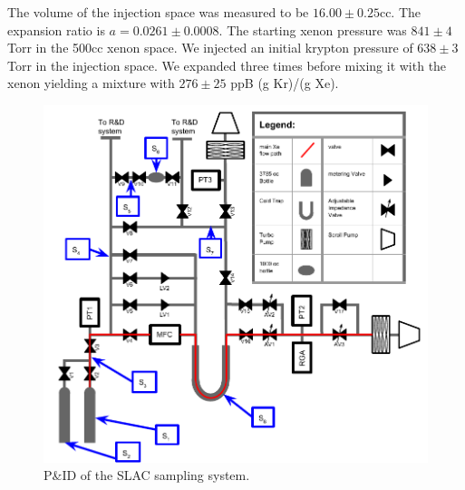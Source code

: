 The volume of the injection space was measured to be $16.00 \pm 0.25$cc. The expansion ratio is $a=0.0261 \pm0.0008$. The starting xenon pressure was $841\pm4$ Torr in the 500cc xenon space. We injected an initial krypton pressure of $638\pm3$ Torr in the injection space. We expanded three times before mixing it with the xenon yielding a mixture with $276\pm25$ ppB (g Kr)/(g Xe).
\begin{figure}[h!]
  \includegraphics[width=\linewidth]{Figures/SLAC_ColdTrap_diagram_wvols.pdf}
  \caption{P\&ID of the SLAC sampling system.}
  \label{fig:SLACpid}
\end{figure}


